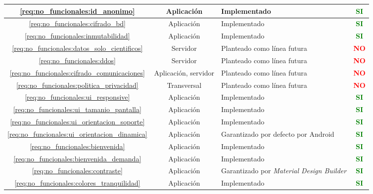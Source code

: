 \begin{xltabular}{\textwidth}{|c|c|X|c|}
        \hline
        \ref{req:no_funcionales:id_anonimo} & Aplicación & Implementado & \textcolor{green}{\textbf{SI}} \\
        \hline
        \ref{req:no_funcionales:cifrado_bd} & Aplicación & Implementado & \textcolor{green}{\textbf{SI}} \\
        \hline
        \ref{req:no_funcionales:inmutabilidad} & Aplicación & Implementado & \textcolor{green}{\textbf{SI}} \\
        \hline
        \ref{req:no_funcionales:datos_solo_cientificos} & Servidor & Planteado como línea futura & \textcolor{red}{\textbf{NO}} \\
        \hline
        \ref{req:no_funcionales:ddos} & Servidor & Planteado como línea futura & \textcolor{red}{\textbf{NO}} \\
        \hline
        \ref{req:no_funcionales:cifrado_comunicaciones} & Aplicación, servidor & Planteado como línea futura & \textcolor{red}{\textbf{NO}} \\
        \hline
        \ref{req:no_funcionales:politica_privacidad} & Transversal & Planteado como línea futura & \textcolor{red}{\textbf{NO}} \\
        \hline
        \ref{req:no_funcionales:ui_responsive} & Aplicación & Implementado & \textcolor{green}{\textbf{SI}} \\
        \hline
        \ref{req:no_funcionales:ui_tamanio_pantalla} & Aplicación & Implementado & \textcolor{green}{\textbf{SI}} \\
        \hline
        \ref{req:no_funcionales:ui_orientacion_soporte} & Aplicación & Implementado & \textcolor{green}{\textbf{SI}} \\
        \hline
        \ref{req:no_funcionales:ui_orientacion_dinamica} & Aplicación & Garantizado por defecto por Android & \textcolor{green}{\textbf{SI}} \\
        \hline
        \ref{req:no_funcionales:bienvenida} & Aplicación & Implementado & \textcolor{green}{\textbf{SI}} \\
        \hline
        \ref{req:no_funcionales:bienvenida_demanda} & Aplicación & Implementado & \textcolor{green}{\textbf{SI}} \\
        \hline
        \ref{req:no_funcionales:contraste} & Aplicación & Garantizado por \textit{Material Design Builder} \cite{material_design_material_nodate-1} & \textcolor{green}{\textbf{SI}} \\
        \hline
        \ref{req:no_funcionales:colores_tranquilidad} & Aplicación & Implementado & \textcolor{green}{\textbf{SI}} \\

\end{xltabular}
